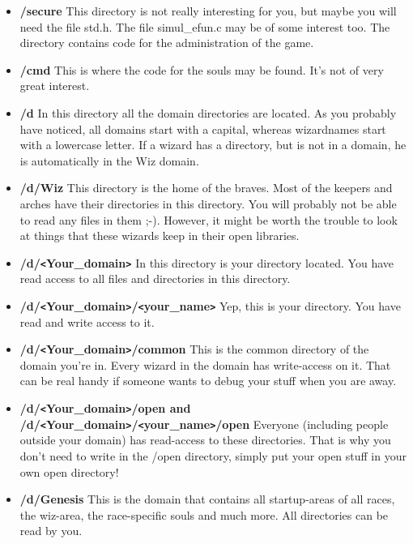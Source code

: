 \begin{itemize}
\item{\bf /secure}
      This directory is not really interesting for you, but maybe you
      will need the file std.h. The file simul\_efun.c may be of some
      interest too.
      The directory contains code for the administration of the game.

\item{\bf /cmd}
      This is where the code for the souls may be found. It's not of
      very great interest.

\item{\bf /d}
      In this directory all the domain directories are located. As you
      probably have noticed, all domains start with a capital, whereas
      wizardnames start with a lowercase letter. If a wizard has a
      directory, but is not in a domain, he is automatically in the Wiz
      domain.
 
\item{\bf /d/Wiz}
      This directory is the home of the braves. Most of the keepers and
      arches have their directories in this directory. You will probably
      not be able to read any files in them ;-).
      However, it might be worth the trouble to look at things that
      these wizards keep in their open libraries.

\item{\bf /d/\verb+<+Your\_domain\verb+>+}
      In this directory is your directory located. You have read access
      to all files and directories in this directory.

\item{\bf /d/\verb+<+Your\_domain\verb+>+/\verb+<+your\_name\verb+>+}
      Yep, this is your directory. You have read and write access to it.

\item{\bf /d/\verb+<+Your\_domain\verb+>+/common}
      This is the common directory of the domain you're in. Every wizard
      in the domain has write-access on it. That can be real handy if
      someone wants to debug your stuff when you are away.

\item{\bf /d/\verb+<+Your\_domain\verb+>+/open and
   /d/\verb+<+Your\_domain\verb+>+/\verb+<+your\_name\verb+>+/open}
      Everyone (including people outside your domain) has read-access to
      these directories. That is why you don't need to write in the /open
      directory, simply put your open stuff in your own open directory!

\item{\bf /d/Genesis}
      This is the domain that contains all startup-areas of all races,
      the wiz-area, the race-specific souls and much more. All directories
      can be read by you.
\end{itemize}


